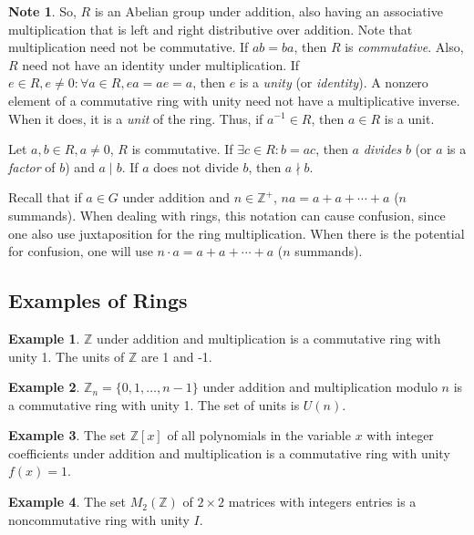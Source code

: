 \documentclass{article}
\theoremstyle{definition}
\newtheorem{example}{Example}[section]
\newtheorem{note}{Note}[section]
\begin{document}
    \begin{note}
        So, $R$ is an Abelian group under addition, also having an associative multiplication that is left and right distributive over addition. Note that multiplication need not be commutative. If $ab=ba$, then $R$ is \textit{commutative}. Also, $R$ need not have an identity under multiplication. If $e\in R, e\neq 0: \forall a \in R, ea=ae=a$, then $e$ is a \textit{unity} (or \textit{identity}). A nonzero element of a commutative ring with unity need not have a multiplicative inverse. When it does, it is a \textit{unit} of the ring. Thus, if $a^{-1}\in R$, then $a\in R$ is a unit.
        
        Let $a,b \in R, a\neq 0$, $R$ is commutative. If $\exists c \in R: b=ac$, then $a$ \textit{divides} $b$ (or $a$ is a \textit{factor} of $b$) and $a\mid b$. If $a$ does not divide $b$, then $a\nmid b$.
        
        Recall that if $a \in G$ under addition and $n \in \mathbb{Z}^+$, $na=a+a+\cdots+a$ ($n$ summands). When dealing with rings, this notation can cause confusion, since one also use juxtaposition for the ring multiplication. When there is the potential for confusion, one will use $n\cdot a = a+a+\cdots+a$ ($n$ summands).
    \end{note}
    
    \subsection{Examples of Rings}
    \begin{example}
        $\mathbb{Z}$ under addition and multiplication is a commutative ring with unity 1. The units of $\mathbb{Z}$ are 1 and -1.
    \end{example}
    
    \begin{example}
        $\mathbb{Z}_n=\{0,1,\dots,n-1\}$ under addition and multiplication modulo $n$ is a commutative ring with unity 1. The set of units is $U(n)$.
    \end{example}
    
    \begin{example}
        The set $\mathbb{Z}[x]$ of all polynomials in the variable $x$ with integer coefficients under addition and multiplication is a commutative ring with unity $f(x)=1$.
    \end{example}
    
    \begin{example}
        The set $M_2(\mathbb{Z})$ of $2\times2$ matrices with integers entries is a noncommutative ring with unity $I$.
    \end{example}
    
\end{document}
